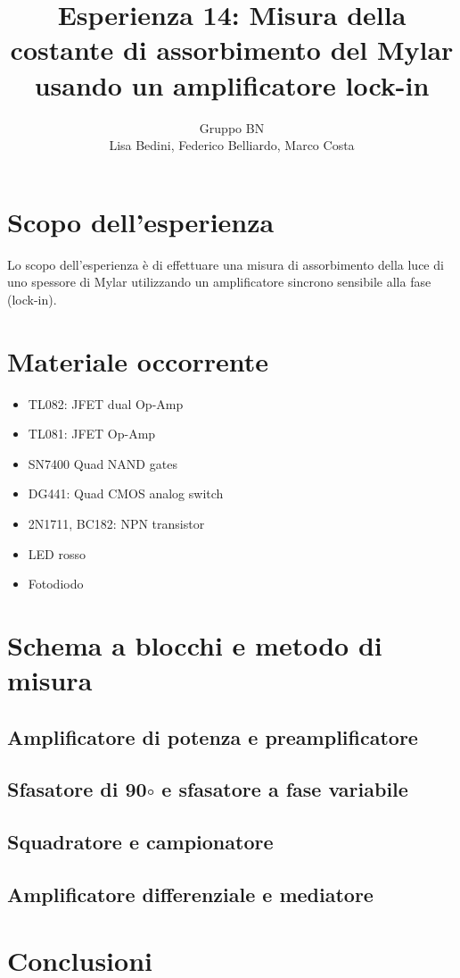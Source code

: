\documentclass[10pt,a4paper]{article}
\author{Gruppo BN \\ Lisa Bedini, Federico Belliardo, Marco Costa}
\title{Esperienza 14: Misura della costante di assorbimento del Mylar usando un amplificatore lock-in}
\begin{document}
\maketitle

\section{Scopo dell'esperienza}
Lo scopo dell'esperienza è di effettuare una misura di assorbimento della luce di uno spessore di Mylar utilizzando un amplificatore sincrono sensibile alla fase (lock-in).

\section{Materiale occorrente}
\begin{itemize}
\item TL082: JFET dual Op-Amp
\item TL081: JFET Op-Amp
\item SN7400 Quad NAND gates
\item DG441: Quad CMOS analog switch
\item 2N1711, BC182: NPN transistor
\item LED rosso
\item Fotodiodo
\end{itemize}

\section{Schema a blocchi e metodo di misura}

\subsection{Amplificatore di potenza e preamplificatore}

\subsection{Sfasatore di 90$\circ$ e sfasatore a fase variabile}

\subsection{Squadratore e campionatore}

\subsection{Amplificatore differenziale e mediatore}

\section{Conclusioni}
\end{document}
